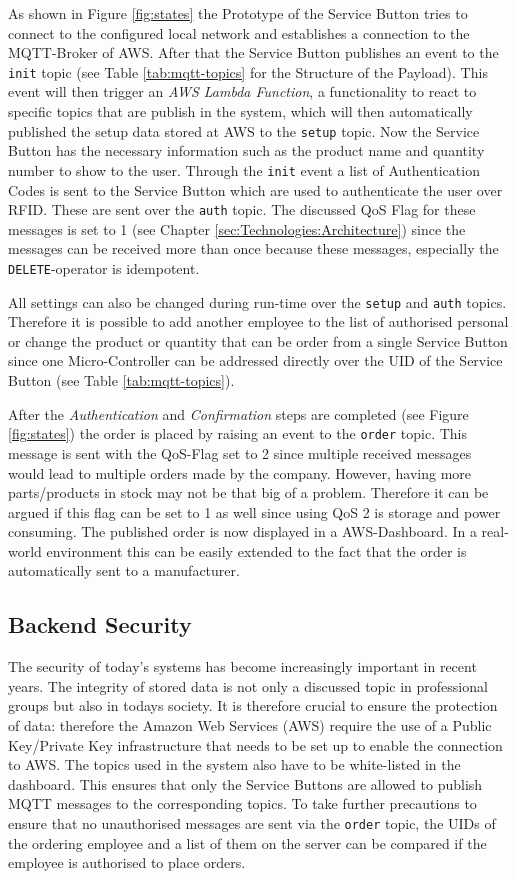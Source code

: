 As shown in Figure \ref{fig:states} the Prototype of the Service Button tries to connect to the configured local network and establishes a connection to the MQTT-Broker of AWS. After that the Service Button publishes an event to the \texttt{init} topic (see Table \ref{tab:mqtt-topics} for the Structure of the Payload). This event will then trigger an \textit{AWS Lambda Function}, a functionality to react to specific topics that are publish in the system, which will then automatically published the setup data stored at AWS to the \texttt{setup} topic. Now the Service Button has the necessary information such as the product name and quantity number to show to the user. Through the \texttt{init} event a list of Authentication Codes is sent to the Service Button which are used to authenticate the user over RFID. These are sent over the \texttt{auth} topic. The discussed QoS Flag for these messages is set to 1 (see Chapter \ref{sec:Technologies:Architecture}) since the messages can be received more than once because these messages, especially the \texttt{DELETE}-operator is idempotent.

All settings can also be changed during run-time over the \texttt{setup} and \texttt{auth} topics. Therefore it is possible to add another employee to the list of authorised personal or change the product or quantity that can be order from a single Service Button since one Micro-Controller can be addressed directly over the UID of the Service Button (see Table \ref{tab:mqtt-topics}).

After the \textit{Authentication} and \textit{Confirmation} steps are completed (see Figure \ref{fig:states}) the order is placed by raising an event to the \texttt{order} topic. This message is sent with the QoS-Flag set to 2 since multiple received messages would lead to multiple orders made by the company. However, having more parts/products in stock may not be that big of a problem. Therefore it can be argued if this flag can be set to 1 as well since using QoS 2 is storage and power consuming. The published order is now displayed in a AWS-Dashboard. In a real-world environment this can be easily extended to the fact that the order is automatically sent to a manufacturer.

\subsection{Backend Security}
\label{sec:Backend:Security}
The security of today's systems has become increasingly important in recent years. The integrity of stored data is not only a discussed topic in professional groups but also in todays society. It is therefore crucial to ensure the protection of data: therefore the Amazon Web Services (AWS) require the use of a Public Key/Private Key infrastructure that needs to be set up to enable the connection to AWS. The topics used in the system also have to be white-listed in the dashboard. This ensures that only the Service Buttons are allowed to publish MQTT messages to the corresponding topics. To take further precautions to ensure that no unauthorised messages are sent via the \texttt{order} topic, the UIDs of the ordering employee and a list of them on the server can be compared if the employee is authorised to place orders. 

